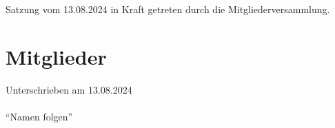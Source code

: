 \documentclass[a4paper]{article}
\renewcommand\thesection{§ \arabic{section}}
\begin{document}
\renewcommand\thesection{}
\section{}
Satzung vom 13.08.2024 in Kraft getreten durch die Mitgliederversammlung.


\pagebreak
\renewcommand\thesection{}
\section{Mitglieder}
Unterschrieben am 13.08.2024 \\ \\
\enquote{Namen folgen}
\end{document}
